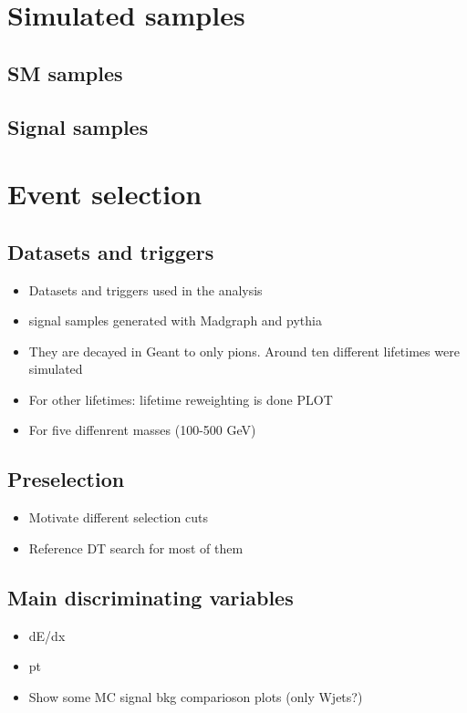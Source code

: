 \section{Simulated samples}
\label{sec:SimulatedSamples}
\subsection{SM samples}
\subsection{Signal samples}
\section{Event selection}
\label{sec:EventSelection}
\subsection{Datasets and triggers}
\begin{itemize}
\item Datasets and triggers used in the analysis
\item signal samples generated with Madgraph and pythia
\item They are decayed in Geant to only pions. Around ten different lifetimes were simulated
\item For other lifetimes: lifetime reweighting is done PLOT
\item For five diffenrent masses (100-500 GeV) 
\end{itemize}
\subsection{Preselection}
\begin{itemize}
\item Motivate different selection cuts
\item Reference DT search for most of them
\end{itemize}
\subsection{Main discriminating variables}
\begin{itemize}
\item dE/dx
\item pt
\item Show some MC signal bkg comparioson plots (only Wjets?)
\end{itemize}

